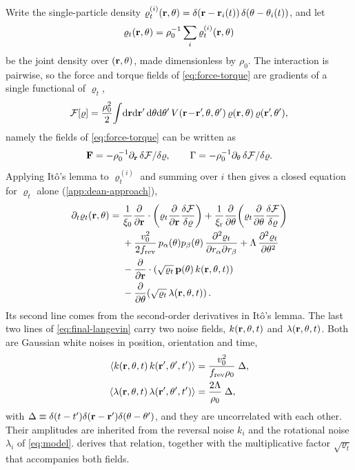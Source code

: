 \documentclass[aps,pre,reprint,superscriptaddress,longbibliography,nofootinbib
]{revtex4-2}
\begin{document}
Write the single-particle density
$\varrho^{(i)}_t(\mathbf{r},\theta) =
\delta(\mathbf{r}-\mathbf{r}_i(t))\,\delta(\theta-\theta_i(t))$, and let
\begin{align}
  \label{eq:joint-density-definition}
  \varrho_t(\mathbf{r},\theta)=\rho_0^{-1}\sum_i\varrho^{(i)}_t(\mathbf{r},\theta)
\end{align}
be the joint density over $(\mathbf{r},\theta)$, made dimensionless
by $\rho_0$. The interaction is pairwise, so the force and
torque fields of \cref{eq:force-torque} are gradients of a
single functional of $\varrho_t$,
\begin{equation}
    \label{eq:pair-free-energy}
    \mathcal{F}[\varrho] = \frac{\rho_0^2}2\!\int\!\mathrm{d}\mathbf{r}\mathrm{d}\mathbf{r}'\,\mathrm{d}\theta\mathrm{d}\theta'\,
    V(\mathbf{r}\!-\!\mathbf{r}'\!,\theta,\theta')\,\varrho(\mathbf{r},\theta)\,\varrho(\mathbf{r}'\!,\theta'),
\end{equation}
namely the fields of \cref{eq:force-torque} can be written
as
\begin{align}
  \label{eq:force-torque-F}
  \mathbf{F}=-\rho_0^{-1}\partial_{\mathbf{r}}\,\delta\mathcal{F}/\delta\varrho ,
  \qquad
  \Gamma=-\rho_0^{-1}\partial_\theta\,\delta\mathcal{F}/\delta\varrho.
\end{align}
Applying It\^o's lemma to $\varrho^{(i)}_t$ and summing
over $i$ then gives a closed equation for $\varrho_t$ alone
(\cref{app:dean-approach}),
\begin{equation}
    \label{eq:final-langevin}
    \begin{aligned}
    \partial_t\varrho_t(\mathbf{r},\theta) = {}&
    \frac1{\xi_0}\frac{\partial }{\partial \mathbf{r}}\cdot\left(\varrho_t\frac{\partial }{\partial \mathbf{r}}\frac{\delta\mathcal{F}}{\delta\varrho}\right)
    + \frac1{\xi_{\rm r}}\frac{\partial }{\partial \theta}\!\left(\varrho_t\frac{\partial }{\partial \theta}\frac{\delta\mathcal{F}}{\delta\varrho}\right)
    \\
    &+ \frac{v_0^2}{2f_{\rm rev}}\,p_\alpha(\theta)p_\beta(\theta)\,\frac{\partial ^2\varrho_t}{\partial r_\alpha\partial r_\beta}
    + \Lambda\,\frac{\partial ^2\varrho_t}{\partial \theta^2}
    \\
    &- \frac{\partial }{\partial \mathbf{r}}\cdot\left(\sqrt{\varrho_t}\,\mathbf{p}(\theta)\,k(\mathbf{r},\theta,t)\right)
    \\
    &- \frac{\partial }{\partial \theta}\!\left(\sqrt{\varrho_t}\,\lambda(\mathbf{r},\theta,t)\right).
    \end{aligned}
\end{equation}
Its second line comes from the second-order derivatives in
It\^o's lemma. The last two lines of
\cref{eq:final-langevin} carry two noise fields,
$k(\mathbf{r},\theta,t)$ and $\lambda(\mathbf{r},\theta,t)$. Both are
Gaussian white noises in position, orientation and time,
\begin{align}
    \label{eq:noise-correlators}
    \left\langle k(\mathbf{r},\theta,t)\,k(\mathbf{r}',\theta',t')\right\rangle &= \frac{v_0^2}{f_{\rm rev}\rho_0}\;\Delta,
    \nonumber\\
    \left\langle \lambda(\mathbf{r},\theta,t)\,\lambda(\mathbf{r}',\theta',t')\right\rangle &= \frac{2\Lambda}{\rho_0}\;\Delta,
\end{align}
with
$\Delta\equiv\delta(t-t')\delta(\mathbf{r}-\mathbf{r}')\delta(\theta-\theta')$,
and they are uncorrelated with each other. Their amplitudes
are inherited from the reversal noise $k_i$ and the
rotational noise $\lambda_i$ of \cref{eq:model}.
 derives that relation, together
with the multiplicative factor $\sqrt{\varrho_t}$ that
accompanies both fields.
\end{document}
